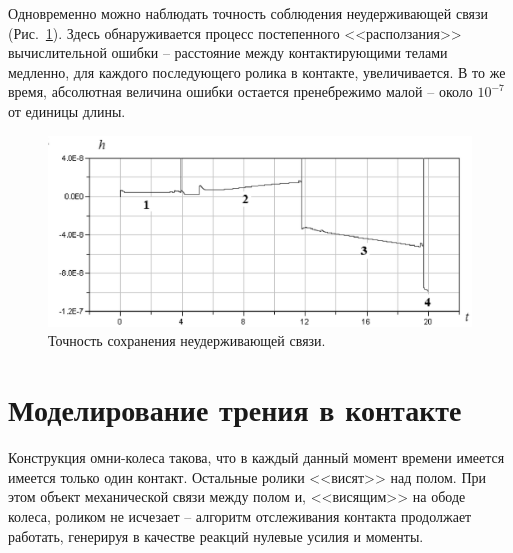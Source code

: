 Одновременно можно наблюдать точность соблюдения неудерживающей связи 
(Рис.~\ref{fig2}). Здесь обнаруживается процесс постепенного <<расползания>>
вычислительной ошибки -- расстояние между контактирующими телами медленно, для
каждого последующего ролика в контакте, увеличивается. В то же время, 
абсолютная величина ошибки остается пренебрежимо малой -- около $10^{-7}$
от единицы длины.

\begin{figure}[htb]
\centerline{\includegraphics[width=15cm]{content/parts/3_friction/nd/Figure21.eps}}
\caption{Точность сохранения неудерживающей связи.}
\label{fig2}
\end{figure}

\section{Моделирование трения в контакте}

Конструкция омни-колеса такова, что в каждый данный 
момент времени имеется имеется только один контакт. Остальные ролики <<висят>>
над полом. При этом объект механической связи между полом и, <<висящим>> на ободе
колеса, роликом не исчезает -- алгоритм отслеживания контакта продолжает 
работать, генерируя в качестве реакций нулевые усилия и моменты.


